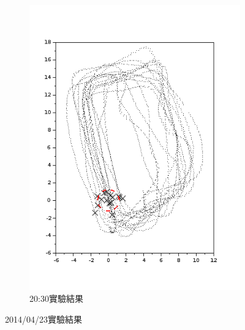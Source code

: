 \begin{figure}[h!]
\begin{subfigure}[t]{0.32\textwidth}
		\includegraphics[width=\textwidth]{figures/appendix1/dynamic_6}
		\caption{20:30實驗結果}
		\label{f:app:dynamic_6}
	\end{subfigure}
	\caption{2014/04/23實驗結果}
\end{figure}
